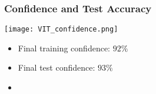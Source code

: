 \documentclass[../presentation.tex]{subfiles} %
\begin{document}
\begin{frame}
    
    \frametitle{Confidence and Test Accuracy}

    \begin{center}
        \texttt{[image: VIT\_confidence.png]}
    \end{center}

    \small{
    \begin{cbox}
        \begin{itemize}
            \item Final training confidence: $92\%$
            \item Final test confidence: $93\%$
            \item {}
        \end{itemize}
    \end{cbox}
    }

\end{frame}
\end{document}
